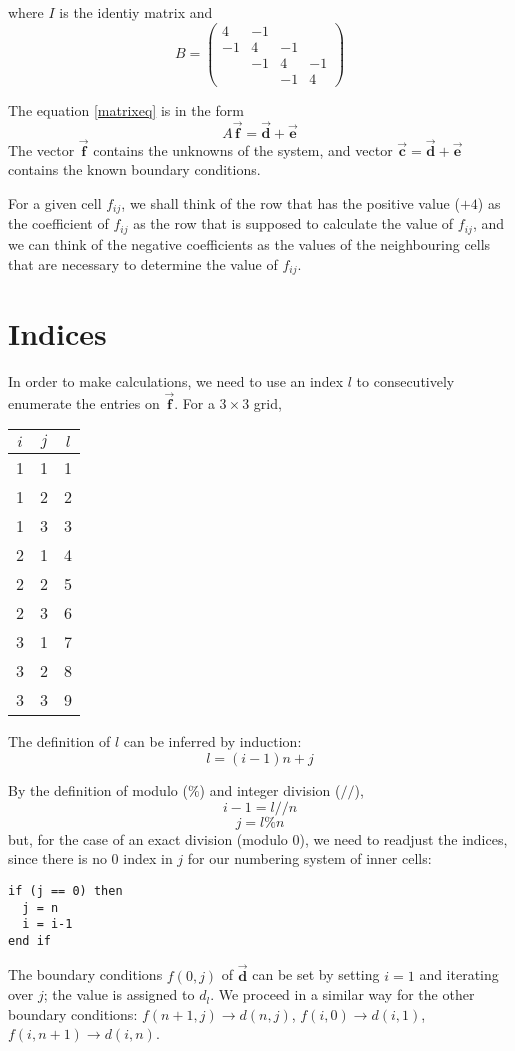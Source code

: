 \documentclass{article}
\let\toparrow\vec
\renewcommand{\vec}[1]{\toparrow{\mathbf{#1}}}
\begin{document}
where $I$ is the identiy matrix and
\[
B =
\left(
\begin{matrix}
4 & -1 & & \\
-1 & 4 & -1 & \\
 & -1 & 4 & -1 \\
 & & -1 & 4
\end{matrix}
\right)
\]

The equation \ref{matrixeq} is in the form
\[ A \vec f = \vec d + \vec e \]
The vector $\vec f$ contains the unknowns of the system, and vector
$\vec c = \vec d + \vec e$ contains the known boundary conditions.

For a given cell $f_{ij}$, we shall think of the row that has the positive value
($+4$) as the coefficient of $f_{ij}$ as the row that is supposed to calculate the value of $f_{ij}$, and
we can think of the negative coefficients as the values of the neighbouring cells
that are necessary to determine the value of $f_{ij}$.

\section{Indices}
In order to make calculations, we need to use an index $l$ to consecutively
enumerate the entries on $\vec f$. For a $3\times 3$ grid,

\begin{tabular}{c c | c}
$i$ & $j$ & $l$ \\ \hline
1 & 1 & 1 \\
1 & 2 & 2 \\
1 & 3 & 3 \\
2 & 1 & 4 \\
2 & 2 & 5 \\
2 & 3 & 6 \\
3 & 1 & 7 \\
3 & 2 & 8 \\
3 & 3 & 9
\end{tabular}

The definition of $l$ can be inferred by induction:
\[ l = (i-1)n + j \]

By the definition of modulo ($\%$) and integer division ($//$),
\[ i-1 = l//n \]
\[ j = l \% n \]
but, for the case of an exact division (modulo 0), we need to readjust the
indices, since there is no 0 index in $j$ for our numbering system of inner cells:
\begin{verbatim}
if (j == 0) then
  j = n
  i = i-1
end if
\end{verbatim}

The boundary conditions $f(0,j)$ of $\vec d$ can be set by setting $i=1$ and iterating
over $j$; the value is assigned to $d_l$. We proceed in a similar way for the other
boundary conditions: $f(n+1,j)\to d(n,j)$, $f(i,0)\to d(i,1)$, $f(i,n+1) \to d(i,n)$.
\end{document}
